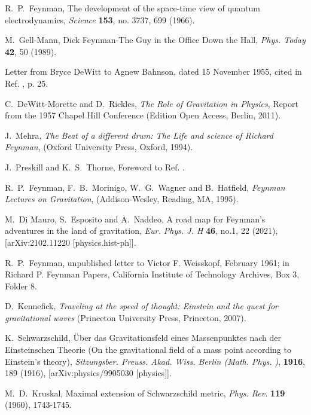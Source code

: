 \documentclass{ws-procs961x669}            %
\begin{document}
\begin{thebibliography}{99}

R.~P.~Feynman, The development of the space-time view of quantum
electrodynamics, {\it Science} \textbf{153}, no. 3737, 699 (1966).

M.~Gell-Mann, Dick Feynman-The Guy in the Office Down the Hall,
{\it Phys. Today} \textbf{42}, 50 (1989).

Letter from Bryce DeWitt to Agnew Bahnson, dated 15 November 1955,
cited in Ref. , p. 25.

C.~DeWitt-Morette and D.~Rickles, {\it The Role of Gravitation in
Physics}, Report from the 1957 Chapel Hill Conference (Edition
Open Access, Berlin, 2011).

J.~Mehra, {\it The Beat of a different drum: The Life and science
of Richard Feynman}, (Oxford University Press, Oxford, 1994).

J.~Preskill and K.~S.~Thorne, Foreword to Ref.
.

R.~P.~Feynman, F.~B.~Morinigo, W.~G.~Wagner and B.~Hatfield, {\it
Feynman Lectures on Gravitation}, (Addison-Wesley, Reading, MA,
1995).

M.~Di Mauro, S.~Esposito and A.~Naddeo, A road map for Feynman's
adventures in the land of gravitation, {\it Eur. Phys. J. H}
\textbf{46}, no.1, 22 (2021), [arXiv:2102.11220
[physics.hist-ph]].

R.~P.~Feynman, unpublished letter to Victor F. Weisskopf, February
1961; in Richard P. Feynman Papers, California Institute of
Technology Archives, Box 3, Folder 8.

D.~Kennefick, \emph{Traveling at the speed of thought: Einstein
and the quest for gravitational waves} (Princeton University
Press, Princeton, 2007).

K.~Schwarzschild, \"{U}ber das Gravitationsfeld eines
Massenpunktes nach der Einsteinschen Theorie (On the gravitational
field of a mass point according to Einstein's theory), {\it
Sitzungsber. Preuss. Akad. Wiss. Berlin (Math. Phys. )},
\textbf{1916}, 189 (1916), [arXiv:physics/9905030 [physics]].

M.~D.~Kruskal, Maximal extension of Schwarzschild metric, {\it
Phys. Rev.} \textbf{119} (1960), 1743-1745.


\end{thebibliography}
\end{document}
